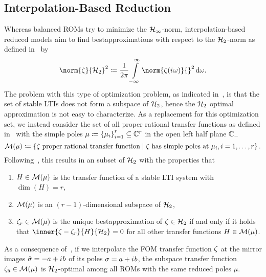 \subsection{Interpolation-Based Reduction}\label{subsec:interpolation-reduction}

Whereas balanced \acp{ROM} try to minimize the $\mathcal{H}_\infty$-norm, interpolation-based reduced models aim to find bestapproximations with respect to the $\mathcal{H}_2$-norm as defined in~\cite[Section~3]{Gugercin2008} by
\begin{equation*}
	\norm{\tfunc}{\mcl{H}_2}^2 \coloneqq \frac{1}{2 \pi} \int\limits_{- \infty}^\infty \norm{\tfunc(\iu \omega)}{}^2 \dif \omega.
\end{equation*}
The problem with this type of optimization problem, as indicated in~\cite[Section~3.1]{Gugercin2008}, is that the set of stable \acp{LTI} does not form a subspace of $\mathcal{H}_2$, hence the $\mathcal{H}_2$ optimal approximation is not easy to characterize.
As a replacement for this optimization set, we instead consider the set of all proper rational transfer functions as defined in~\cite[Section~1.3.1]{Corless2003} with the simple poles $\mu \coloneqq {\left\{\mu_i\right\}}_{i = 1}^r \subseteq \mathbb{C}^r$ in the open left half plane $\mathbb{C}_{-}$
\begin{equation*}
    \mathcal{M}(\mu) \coloneqq \left\{\zeta \text{ proper rational transfer function}\mid\zeta \text{ has simple poles at } \mu_i, i = 1, \dots, r\right\}.
\end{equation*}
Following~\cite[Theorem~3.1]{Gugercin2008}, this results in an subset of $\mathcal{H}_2$ with the properties that
\begin{enumerate}
    \item $H \in \mathcal{M}(\mu)$ is the transfer function of a stable \ac{LTI} system with $\dim{(H)} = r$,
    \item $\mathcal{M}(\mu)$ is an $(r - 1)$-dimensional subspace of $\mathcal{H}_2$,
    \item $\zeta_r \in \mathcal{M}(\mu)$ is the unique bestapproximation of $\zeta \in \mathcal{H}_2$ if and only if it holds that $\inner{\tfunc - \tfunc_r}{H}{\mcl{H}_2} = 0$ for all other transfer functions $H \in \mathcal{M}(\mu)$.
\end{enumerate}
As a consequence of~\cite[Theorem~3.1]{Gugercin2008}, if we interpolate the \ac{FOM} transfer function $\zeta$ at the mirror images $\hat{\sigma} = -a + {i\mkern1mu} b$ of its poles $\sigma = a + {i\mkern1mu} b$, the subspace transfer function $\zeta_{\textnormal{\scshape r}} \in \mathcal{M}(\mu)$ is $\mathcal{H}_2$-optimal among all \acp{ROM} with the same reduced poles $\mu$.

